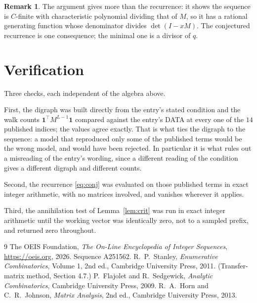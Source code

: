 \documentclass[11pt,a4paper]{article}
\theoremstyle{plain}
\theoremstyle{definition}
\newtheorem{remark}[theorem]{Remark}
\begin{document}
\begin{remark}
The argument gives more than the recurrence: it shows the sequence is $C$-finite with
characteristic polynomial dividing that of $M$, so it has a rational generating function
whose denominator divides $\det(I-xM)$. The conjectured recurrence is one consequence; the
minimal one is a divisor of $q$.
\end{remark}

\section{Verification}

Three checks, each independent of the algebra above.

First, the digraph was built directly from the entry's stated condition and the walk counts
$\mathbf{1}^{\!\top}M^{L-1}\mathbf{1}$ compared against the entry's DATA at
every one of the $14$ published indices; the values agree exactly. That is what ties
the digraph to the sequence: a model that reproduced only some of the published terms would
be the wrong model, and would have been rejected. In particular it is what rules out a
misreading of the entry's wording, since a different reading of the condition gives a
different digraph and different counts.

Second, the recurrence \eqref{eq:conj} was evaluated on those published terms in exact
integer arithmetic, with no matrices involved, and vanishes wherever it applies.

Third, the annihilation test of Lemma~\ref{lem:crit} was run in exact integer arithmetic
until the working vector was identically zero, not to a sampled prefix, and returned zero
throughout.

\begin{thebibliography}{9}
 The OEIS Foundation, \emph{The On-Line Encyclopedia of Integer
Sequences}, \url{https://oeis.org}, 2026. Sequence A251562.
 R.~P.~Stanley, \emph{Enumerative Combinatorics}, Volume 1, 2nd ed.,
Cambridge University Press, 2011. (Transfer-matrix method, Section 4.7.)
 P.~Flajolet and R.~Sedgewick, \emph{Analytic Combinatorics}, Cambridge
University Press, 2009.
 R.~A.~Horn and C.~R.~Johnson, \emph{Matrix Analysis}, 2nd ed., Cambridge
University Press, 2013.
\end{thebibliography}
\end{document}
